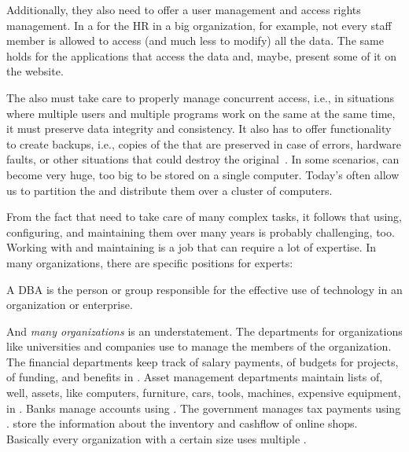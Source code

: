 Additionally, they also need to offer a user management and access rights management.
In a  for the \acrfull{HR} in a big organization, for example, not every  staff member is allowed to access (and much less to modify) all the data.
The same holds for the applications that access the data and, maybe, present some of it on the website.

The  also must take care to properly manage concurrent access, i.e., in situations where multiple users and multiple programs work on the same  at the same time, it must preserve data integrity and consistency.
It also has to offer functionality to create backups, i.e., copies of the  that are preserved in case of errors, hardware faults, or other situations that could destroy the original~.
In some scenarios,  can become very huge, too big to be stored on a single computer.
Today's  often allow us to partition the  and distribute them over a cluster of computers.

From the fact that  need to take care of many complex tasks, it follows that using, configuring, and maintaining them over many years is probably challenging, too.
Working with and maintaining  is a job that can require a lot of expertise.
In many organizations, there are specific positions for  experts:%
%
\begin{definition}
A \acrfull{DBA} is the person or group responsible for the effective use of  technology in an organization or enterprise.
\end{definition}%
%
And \emph{many organizations} is an understatement.
The  departments for organizations like universities and companies use  to manage the members of the organization.
The financial departments keep track of salary payments, of budgets for projects, of funding, and benefits in .
Asset management departments maintain lists of, well, assets, like computers, furniture, cars, tools, machines, expensive equipment, in .
Banks manage accounts using .
The government manages tax payments using .
 store the information about the inventory and cashflow of online shops.
Basically every organization with a certain size uses multiple .%
%
%
%
%
%
\endhsection\endhsection%
%
